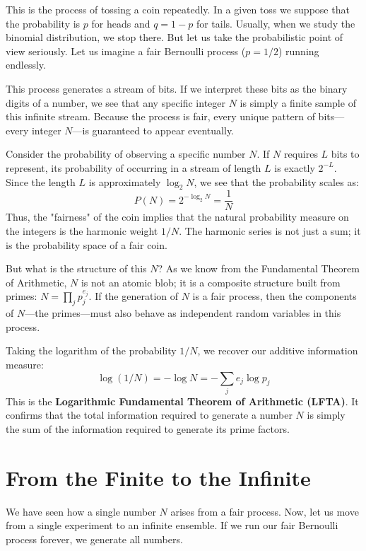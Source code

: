 \documentclass[12pt]{article}
\begin{document}
This is the process of tossing a coin repeatedly. In a given toss we suppose that the probability is $p$ for heads and $q = 1-p$ for tails. Usually, when we study the binomial distribution, we stop there. But let us take the probabilistic point of view seriously. Let us imagine a fair Bernoulli process ($p = 1/2$) running endlessly.

This process generates a stream of bits. If we interpret these bits as the binary digits of a number, we see that any specific integer $N$ is simply a finite sample of this infinite stream. Because the process is fair, every unique pattern of bits—every integer $N$—is guaranteed to appear eventually.

Consider the probability of observing a specific number $N$. If $N$ requires $L$ bits to represent, its probability of occurring in a stream of length $L$ is exactly $2^{-L}$. Since the length $L$ is approximately $\log_2 N$, we see that the probability scales as:
\begin{equation}
P(N) = 2^{-\log_2 N} = \frac{1}{N}
\end{equation}
Thus, the "fairness" of the coin implies that the natural probability measure on the integers is the harmonic weight $1/N$. The harmonic series is not just a sum; it is the probability space of a fair coin.

But what is the structure of this $N$? As we know from the Fundamental Theorem of Arithmetic, $N$ is not an atomic blob; it is a composite structure built from primes: $N = \prod_{j} p_j^{e_j}$. If the generation of $N$ is a fair process, then the components of $N$—the primes—must also behave as independent random variables in this process.

Taking the logarithm of the probability $1/N$, we recover our additive information measure:
\begin{equation}
\log(1/N) = -\log N = -\sum_{j} e_j \log p_j
\end{equation}
This is the \textbf{Logarithmic Fundamental Theorem of Arithmetic (LFTA)}. It confirms that the total information required to generate a number $N$ is simply the sum of the information required to generate its prime factors.

\section{From the Finite to the Infinite}

We have seen how a single number $N$ arises from a fair process. Now, let us move from a single experiment to an infinite ensemble. If we run our fair Bernoulli process forever, we generate all numbers.
\end{document}
